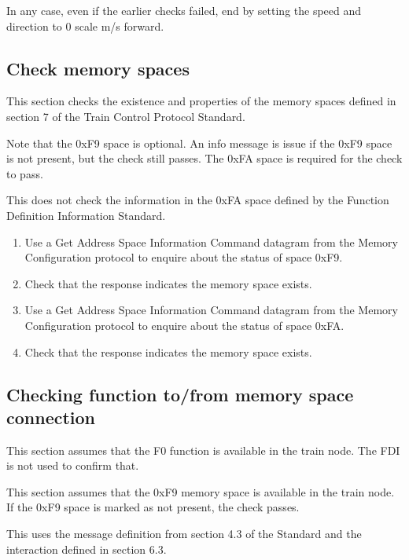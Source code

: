 In any case, even if the earlier checks failed, end by setting the speed 
and direction to 0 scale m/s forward.

\subsection{Check memory spaces}

This section checks the existence and properties of the memory spaces defined in section 7
of the Train Control Protocol Standard.

Note that the 0xF9 space is optional.  An info message is issue if the 0xF9 space
is not present, but the check still passes.  The 0xFA space is required for the check to pass.

This does not check the information in the 0xFA space defined by the 
Function Definition Information Standard.

\begin{enumerate}

\item Use a Get Address Space Information Command datagram from the Memory Configuration protocol
to enquire about the status of space 0xF9.

\item Check that the response indicates the memory space exists.

\item Use a Get Address Space Information Command datagram from the Memory Configuration protocol
to enquire about the status of space 0xFA.

\item Check that the response indicates the memory space exists.

\end{enumerate}
    
\subsection{Checking function to/from memory space connection}

This section assumes that the F0 function is available in the train node.
The FDI is not used to confirm that.

This section assumes that the 0xF9 memory space is available in the train node.
If the 0xF9 space is marked as not present, the check passes.

This uses the message definition from section 4.3 of the Standard 
and the interaction defined in section 6.3.

